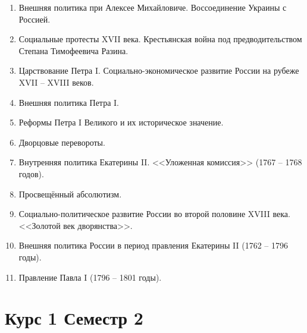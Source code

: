 \documentclass{article}
\begin{document}
\begin{enumerate}
	\item Внешняя политика при Алексее Михайловиче. Воссоединение Украины с Россией.
	\item Социальные протесты XVII века. Крестьянская война под предводительством Степана Тимофеевича Разина.
	\item Царствование Петра I. Социально-экономическое развитие России на рубеже XVII -- XVIII веков.
	\item Внешняя политика Петра I.
	\item Реформы Петра I Великого и их историческое значение.
	\item Дворцовые перевороты.
	\item Внутренняя политика Екатерины II. <<Уложенная комиссия>> (1767 -- 1768 годов).
	\item Просвещённый абсолютизм.
	\item Социально-политическое развитие России во второй половине XVIII века. <<Золотой век дворянства>>.
	\item Внешняя политика России в период правления Екатерины II (1762 -- 1796 годы).
	\item Правление Павла I (1796 -- 1801 годы).
\end{enumerate}
\section*{Курс 1 Семестр 2}
\end{document}
